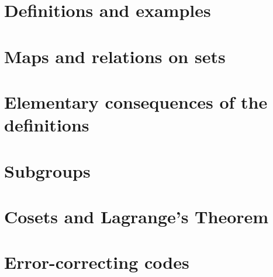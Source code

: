 

\newcommand{\get}[1]{\section{#1}}



\get{Definitions and examples}
\get{Maps and relations on sets}
\get{Elementary consequences of the definitions}
\get{Subgroups}
\get{Cosets and Lagrange's Theorem}
\get{Error-correcting codes}


